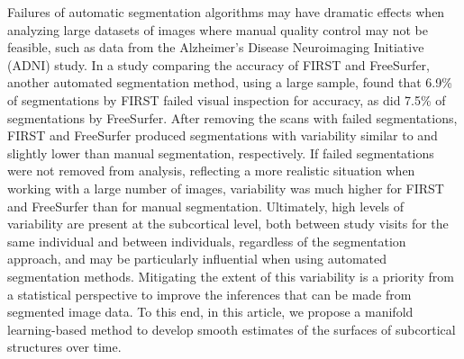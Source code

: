 \documentclass[12pt]{article}
\theoremstyle{definition}
\begin{document}
Failures of automatic segmentation algorithms may have dramatic effects when analyzing large datasets of images where manual quality control may not be feasible, such as data from the Alzheimer's Disease Neuroimaging Initiative (ADNI) study. In a study comparing the accuracy of FIRST and FreeSurfer, another automated segmentation method, using a large sample, \cite{mulder2014Hippocampal} found that 6.9\% of segmentations by FIRST failed visual inspection for accuracy, as did 7.5\% of segmentations by FreeSurfer. After removing the scans with failed segmentations, FIRST and FreeSurfer produced segmentations with variability similar to and slightly lower than manual segmentation, respectively. If failed segmentations were not removed from analysis, reflecting a more realistic situation when working with a large number of images, variability was much higher for FIRST and FreeSurfer than for manual segmentation.  Ultimately, high levels of variability are present at the subcortical level, both between study visits for the same individual and between individuals, regardless of the segmentation approach, and may be particularly influential when using automated segmentation methods. Mitigating the extent of this variability is a priority from a statistical perspective to improve the inferences that can be made from segmented image data. To this end, in this article, we propose a manifold learning-based method to develop smooth estimates of the surfaces of subcortical structures over time.
\end{document}
